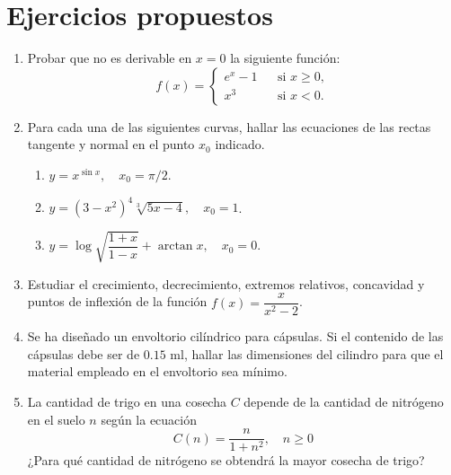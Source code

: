 \section{Ejercicios propuestos}
\begin{enumerate}[leftmargin=*]
\item  Probar que no es derivable en $x=0$ la siguiente función:
      \[ f(x)=\left\{
      \begin{array}{ccl}
      e^x-1 &  & \mbox{si } x\geq 0, \\
      x^3   &  & \mbox{si } x<0.
      \end{array}\right.
      \]

\item  Para cada una de las siguientes curvas, hallar las ecuaciones de las rectas tangente y normal en el punto $x_{0}$ indicado.
      \begin{enumerate}
      \item  $y=x^{\sin x},\quad x_{0}=\pi/2$.
      \item  $y=(3-x^2)^4\sqrt[3]{5x-4},\quad x_{0}=1$.
      \item  $y=\log \sqrt{\dfrac{1+x}{1-x}}+\arctan x, \quad x_{0}=0$.
      \end{enumerate}

\item Estudiar el crecimiento, decrecimiento, extremos relativos, concavidad y puntos de inflexión de la función $f(x)=\dfrac{x}{x^2-2}$.

\item Se ha diseñado un envoltorio cilíndrico para cápsulas.
      Si el contenido de las cápsulas debe ser de $0.15$ ml, hallar las dimensiones del cilindro para que el material empleado en el envoltorio
      sea mínimo.

\item La cantidad de trigo en una cosecha $C$ depende de la cantidad de nitrógeno en el suelo $n$ según la ecuación
      \[
      C(n) = \frac{n}{1+n^2}, \quad n\geq0
      \]
      ¿Para qué cantidad de nitrógeno se obtendrá la mayor cosecha de trigo?
\end{enumerate}
